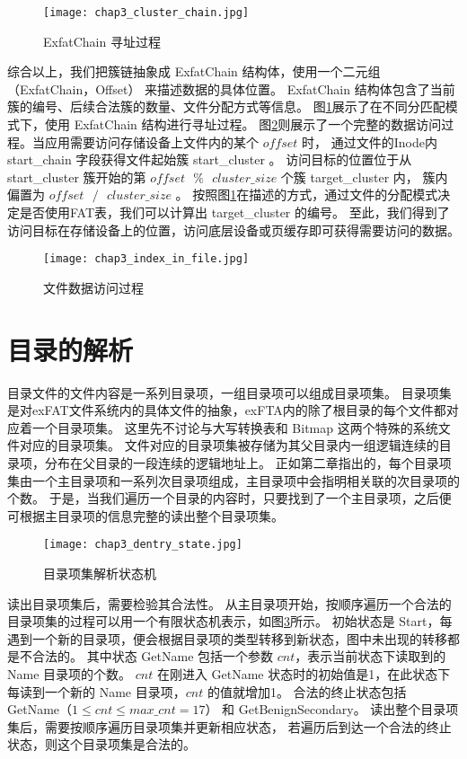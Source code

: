 \begin{figure}[h]
    \centering
    \texttt{[image: chap3\_cluster\_chain.jpg]}
    \caption{ExfatChain 寻址过程}
    \label{fig:cluster_chain}
\end{figure}

综合以上，我们把簇链抽象成 ExfatChain 结构体，使用一个二元组 （ExfatChain，Offset） 来描述数据的具体位置。
ExfatChain 结构体包含了当前簇的编号、后续合法簇的数量、文件分配方式等信息。
图\ref{fig:cluster_chain}展示了在不同分匹配模式下，使用 ExfatChain 结构进行寻址过程。
图\ref{fig:index_in_file}则展示了一个完整的数据访问过程。当应用需要访问存储设备上文件内的某个 $ offset $ 时，
通过文件的Inode内 start\_chain 字段获得文件起始簇 start\_cluster 。
访问目标的位置位于从 start\_cluster 簇开始的第 $ offset \text{ }\%\text{ } cluster\_size $ 个簇 target\_cluster 内，
簇内偏置为 $ offset \text{ }/\text{ } cluster\_size $ 。
按照图\ref{fig:cluster_chain}在描述的方式，通过文件的分配模式决定是否使用FAT表，我们可以计算出 target\_cluster 的编号。
至此，我们得到了访问目标在存储设备上的位置，访问底层设备或页缓存即可获得需要访问的数据。

\begin{figure}[h]
    \centering
    \texttt{[image: chap3\_index\_in\_file.jpg]}
    \caption{文件数据访问过程}
    \label{fig:index_in_file}
\end{figure}

\section{目录的解析}\label{sec:dentry}
目录文件的文件内容是一系列目录项，一组目录项可以组成目录项集。
目录项集是对exFAT文件系统内的具体文件的抽象，exFTA内的除了根目录的每个文件都对应着一个目录项集。
这里先不讨论与大写转换表和 Bitmap 这两个特殊的系统文件对应的目录项集。
文件对应的目录项集被存储为其父目录内一组逻辑连续的目录项，分布在父目录的一段连续的逻辑地址上。
正如第二章指出的，每个目录项集由一个主目录项和一系列次目录项组成，主目录项中会指明相关联的次目录项的个数。
于是，当我们遍历一个目录的内容时，只要找到了一个主目录项，之后便可根据主目录项的信息完整的读出整个目录项集。

\begin{figure}[h]
    \centering
    \texttt{[image: chap3\_dentry\_state.jpg]}
    \caption{目录项集解析状态机}
    \label{fig:dentry_state}
\end{figure}

读出目录项集后，需要检验其合法性。
从主目录项开始，按顺序遍历一个合法的目录项集的过程可以用一个有限状态机表示，如图\ref{fig:dentry_state}所示。
初始状态是 Start，每遇到一个新的目录项，便会根据目录项的类型转移到新状态，图中未出现的转移都是不合法的。
其中状态 GetName 包括一个参数 $ cnt $，表示当前状态下读取到的 Name 目录项的个数。
$ cnt $ 在刚进入 GetName 状态时的初始值是1，在此状态下每读到一个新的 Name 目录项，$ cnt $ 的值就增加1。
合法的终止状态包括 GetName（$ 1 \leq cnt \leq max\_cnt = 17 $） 和 GetBenignSecondary。 
读出整个目录项集后，需要按顺序遍历目录项集并更新相应状态，
若遍历后到达一个合法的终止状态，则这个目录项集是合法的。


